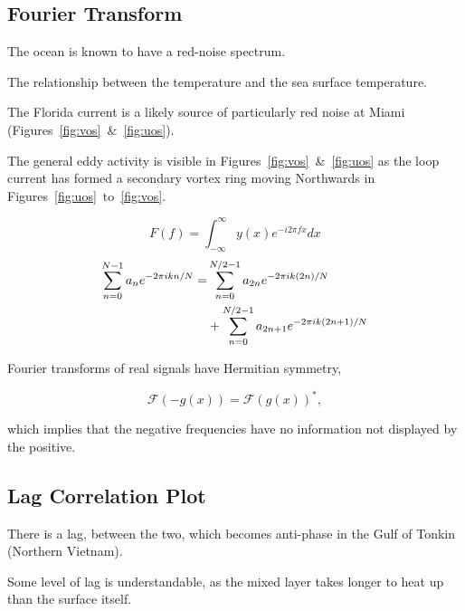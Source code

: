 \subsection{Fourier Transform}
\label{sec:fourier}


The ocean is known to have a red-noise spectrum.

The relationship between the temperature and the sea surface temperature.

The Florida current is a likely source of particularly red noise at Miami
(Figures~\ref{fig:vos}~\&~\ref{fig:uos}).


The general eddy activity is visible in Figures~\ref{fig:vos}~\&~\ref{fig:uos}
as the loop current has formed a secondary vortex ring moving Northwards
in Figures~\ref{fig:uos}~to~\ref{fig:vos}.




\begin{equation}
F(f)=\int_{-\infty}^{\infty} y(x) e^{-i 2\pi f x} d x
\end{equation}
\begin{eqnarray}
\sum_{n=0}^{N-1} a_{n} e^{-2 \pi i  k n/ N}=&\sum_{n=0}^{N / 2-1} a_{2 n}
e^{-2 \pi i k (2 n)/ N}  \\ &+\sum_{n=0}^{N / 2-1} a_{2n+1} e^{-2 \pi i k (2 n+1)/ N} \notag
\end{eqnarray}





Fourier transforms of real signals have Hermitian symmetry,

\begin{equation}
\mathcal{F}{(-g(x))}=\mathcal{F}(g(x))^{*},
\end{equation}

which implies that the negative frequencies
have no information not displayed by the positive.



\subsection{Lag Correlation Plot}
\label{sec:lag}

There is a lag, between the two, which becomes anti-phase in the Gulf
of Tonkin (Northern Vietnam).

Some level of lag is understandable, as the mixed layer takes longer
to heat up than the surface itself.



\FloatBarrier
